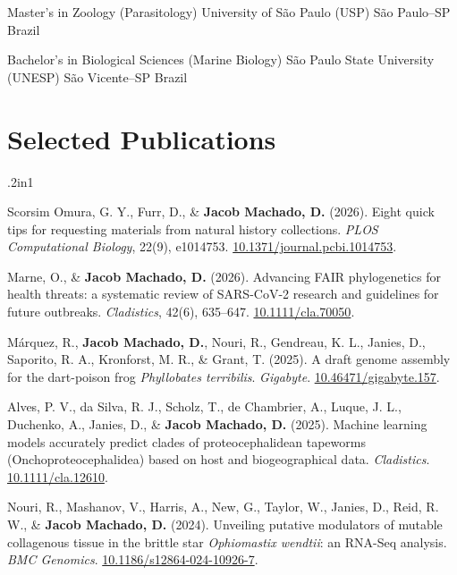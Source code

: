 \documentclass[11pt, letterpaper, sans]{moderncv}
\begin{document}
    {Master's in Zoology (Parasitology)}
    {University of São Paulo (USP)}
    {São Paulo--SP}
    {Brazil}
    {}

    {Bachelor's in Biological Sciences (Marine Biology)}
    {São Paulo State University (UNESP)}
    {São Vicente--SP}
    {Brazil}
    {}


\section{Selected Publications}

    \begin{hangparas}{.2in}{1}

    Scorsim Omura, G. Y., Furr, D., \& \textbf{Jacob Machado, D.} (2026). Eight quick tips for requesting materials from natural history collections. \textit{PLOS Computational Biology}, 22(9), e1014753. \href{https://doi.org/10.1371/journal.pcbi.1014753}{10.1371/journal.pcbi.1014753}.

    Marne, O., \& \textbf{Jacob Machado, D.} (2026). Advancing FAIR phylogenetics for health threats: a systematic review of SARS-CoV-2 research and guidelines for future outbreaks. \textit{Cladistics}, 42(6), 635--647. \href{https://doi.org/10.1111/cla.70050}{10.1111/cla.70050}.

    Márquez, R., \textbf{Jacob Machado, D.}, Nouri, R., Gendreau, K. L., Janies, D., Saporito, R. A., Kronforst, M. R., \& Grant, T. (2025). A draft genome assembly for the dart-poison frog \textit{Phyllobates terribilis}. \textit{Gigabyte}. \href{https://doi.org/10.46471/gigabyte.157}{10.46471/gigabyte.157}.

    Alves, P. V., da Silva, R. J., Scholz, T., de Chambrier, A., Luque, J. L., Duchenko, A., Janies, D., \& \textbf{Jacob Machado, D.} (2025). Machine learning models accurately predict clades of proteocephalidean tapeworms (Onchoproteocephalidea) based on host and biogeographical data. \textit{Cladistics}. \href{https://doi.org/10.1111/cla.12610}{10.1111/cla.12610}.

    Nouri, R., Mashanov, V., Harris, A., New, G., Taylor, W., Janies, D., Reid, R. W., \& \textbf{Jacob Machado, D.} (2024). Unveiling putative modulators of mutable collagenous tissue in the brittle star \textit{Ophiomastix wendtii}: an RNA-Seq analysis. \textit{BMC Genomics}. \href{https://doi.org/10.1186/s12864-024-10926-7}{10.1186/s12864-024-10926-7}.


\end{hangparas}
\end{document}
